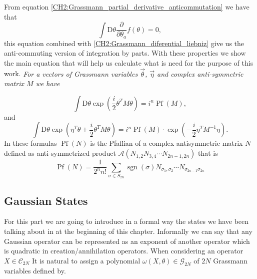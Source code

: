 From equation \eqref{CH2:Grassmann_partial_derivative_anticommutation}  we have that
\begin{equation}
\int \mathrm{D} \theta \frac{\partial}{\partial \theta_{a}} f(\theta)=0,
\end{equation}
this equation combined with \eqref{CH2:Grassmann_diferential_liebniz} give us the anti-commuting version of integration by parts.
\newline
With these properties we show the main equation that will help us calculate what is need for the purpose of this work.
\newline
\textit{For a vectors of Grassmann variables  $\vec{\theta}$, $\vec{\eta}$ and complex anti-symmetric matrix $M$ we have}

\begin{equation}
\int \mathrm{D} \theta \exp \left(\frac{i}{2} \theta^{T} M \theta\right)=i^{n} \operatorname{Pf}(M),
\label{CH2:Grassman_property_1}
\end{equation}
and
\begin{equation}
\int \mathrm{D} \theta \exp \left(\eta^{T} \theta+\frac{i}{2} \theta^{T} M \theta\right)= i^{n} \operatorname{Pf}(M)  \cdot \exp \left(-\frac{i}{2} \eta^{T} M^{-1} \eta\right).
\label{CH2:Grassman_property_2}
\end{equation}
In these formulas $\operatorname{Pf}(N)$ is the Pfaffian of a complex antisymmetric matrix $N$ defined as  anti-symmetrized product $\mathcal{A}(N_{1,2}N_{3,4}\cdots N_{2n-1,2n})$ that is
\begin{equation}
\operatorname{Pf}(N)=\frac{1}{2^{n} n !} \sum_{\sigma \in S_{2 n}} \operatorname{sgn}(\sigma) N_{\sigma_{1}, \sigma_{2}} \cdots N_{\sigma_{2 n-1} \sigma_{2 n}}
\label{CH2:Grassmann_Pfaffian}
\end{equation}
\subsection{Gaussian States}

For this part we are going to introduce in a formal way the states we have been talking about in at the beginning of this chapter. Informally we can say that any Gaussian operator can be represented as an exponent of another operator which is quadratic in creation/annihilation operators. When considering an operator $X\in\mathcal{C}_{2N}$ It is natural to assign a polynomial $\omega(X,\theta)\in \mathcal{G}_{2N}$ of $2N$ Grassmann variables defined by.

